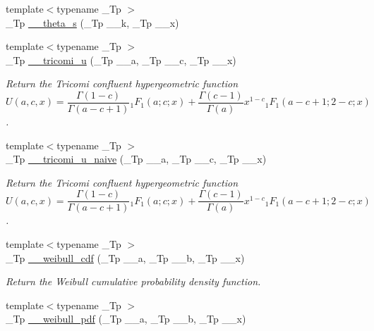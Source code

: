 \begin{DoxyCompactItemize}
\item 
{\footnotesize template$<$typename \+\_\+\+Tp $>$ }\\\+\_\+\+Tp \hyperlink{namespacestd_1_1____detail_aeac5da2d394fafe6432871abf5c05413}{\+\_\+\+\_\+theta\+\_\+s} (\+\_\+\+Tp \+\_\+\+\_\+k, \+\_\+\+Tp \+\_\+\+\_\+x)
\item 
{\footnotesize template$<$typename \+\_\+\+Tp $>$ }\\\+\_\+\+Tp \hyperlink{namespacestd_1_1____detail_ae67133e463041158ebbffe6c54af6e0a}{\+\_\+\+\_\+tricomi\+\_\+u} (\+\_\+\+Tp \+\_\+\+\_\+a, \+\_\+\+Tp \+\_\+\+\_\+c, \+\_\+\+Tp \+\_\+\+\_\+x)
\begin{DoxyCompactList}\small\item\em Return the Tricomi confluent hypergeometric function \[ U(a,c,x) = \frac{\Gamma(1-c)}{\Gamma(a-c+1)} {}_1F_1(a;c;x) + \frac{\Gamma(c-1)}{\Gamma(a)} x^{1-c} {}_1F_1(a-c+1;2-c;x) \]. \end{DoxyCompactList}\item 
{\footnotesize template$<$typename \+\_\+\+Tp $>$ }\\\+\_\+\+Tp \hyperlink{namespacestd_1_1____detail_adc131cec2eae93bacc28d6afd89def2f}{\+\_\+\+\_\+tricomi\+\_\+u\+\_\+naive} (\+\_\+\+Tp \+\_\+\+\_\+a, \+\_\+\+Tp \+\_\+\+\_\+c, \+\_\+\+Tp \+\_\+\+\_\+x)
\begin{DoxyCompactList}\small\item\em Return the Tricomi confluent hypergeometric function \[ U(a,c,x) = \frac{\Gamma(1-c)}{\Gamma(a-c+1)} {}_1F_1(a;c;x) + \frac{\Gamma(c-1)}{\Gamma(a)} x^{1-c} {}_1F_1(a-c+1;2-c;x) \]. \end{DoxyCompactList}\item 
{\footnotesize template$<$typename \+\_\+\+Tp $>$ }\\\+\_\+\+Tp \hyperlink{namespacestd_1_1____detail_aeb9a99b7ca44c9e403f78baf38dc293b}{\+\_\+\+\_\+weibull\+\_\+cdf} (\+\_\+\+Tp \+\_\+\+\_\+a, \+\_\+\+Tp \+\_\+\+\_\+b, \+\_\+\+Tp \+\_\+\+\_\+x)
\begin{DoxyCompactList}\small\item\em Return the Weibull cumulative probability density function. \end{DoxyCompactList}\item 
{\footnotesize template$<$typename \+\_\+\+Tp $>$ }\\\+\_\+\+Tp \hyperlink{namespacestd_1_1____detail_ab15a21521bc750303938a108c5a0bb0b}{\+\_\+\+\_\+weibull\+\_\+pdf} (\+\_\+\+Tp \+\_\+\+\_\+a, \+\_\+\+Tp \+\_\+\+\_\+b, \+\_\+\+Tp \+\_\+\+\_\+x)

\end{DoxyCompactItemize}
